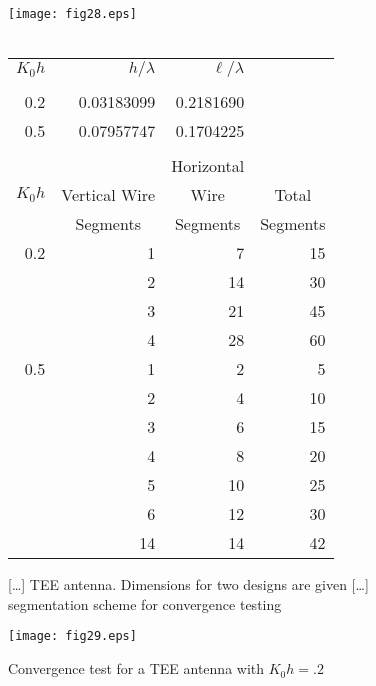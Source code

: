\documentclass[12pt]{article}
\begin{document}
\begin{figure}[htb]
\begin{center}
\texttt{[image: fig28.eps]}\\
\ \\
\begin{tabular}{r|r|r|r}
$K_0h$ & $h/\lambda$ & $\ell/\lambda$ \\[3pt]
\cline{1-3}
       &             &                    \\[-8pt]
0.2    & 0.03183099  & 0.2181690          \\
0.5    & 0.07957747  & 0.1704225          \\
\multicolumn{4}{c}{}               \\
                                   &
                                   &
\multicolumn{1}{c|}{Horizontal}    &
                                   \\
\multicolumn{1}{c|}{$K_0h$}        &
\multicolumn{1}{c|}{Vertical Wire} &
\multicolumn{1}{c|}{Wire}          &
\multicolumn{1}{c}{Total}          \\
                                   &
\multicolumn{1}{c|}{Segments}      &
\multicolumn{1}{c|}{Segments}      &
\multicolumn{1}{c}{Segments}       \\
\hline
0.2 &  1  &  7 & 15 \\
    &  2  & 14 & 30 \\
    &  3  & 21 & 45 \\
    &  4  & 28 & 60 \\
\hline
0.5 &  1  &  2 &  5 \\
    &  2  &  4 & 10 \\
    &  3  &  6 & 15 \\
    &  4  &  8 & 20 \\
    &  5  & 10 & 25 \\
    &  6  & 12 & 30 \\
    & 14  & 14 & 42 \\
\end{tabular}
\end{center}
\caption{[\ldots] TEE antenna. Dimensions for two designs are given [\ldots]
segmentation scheme for convergence testing}
\label{fig28}
\end{figure}

\begin{sidewaysfigure}[htb]
\centerline{\texttt{[image: fig29.eps]}}
\caption{Convergence test for a TEE antenna with $K_0 h = .2$}
\label{fig29}
\end{sidewaysfigure}
\end{document}
